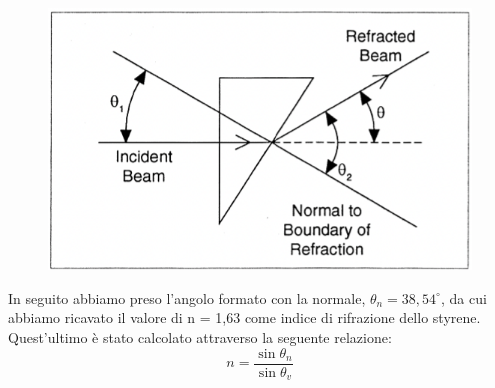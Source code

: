 \begin{figure}[h!]
    \centering
    \includegraphics[scale=.7]{Immagini/triangolo.png}
    \caption{}
    \label{triangolo}
\end{figure}
 
In seguito abbiamo preso l'angolo formato con la normale, $\theta_n = 38,54 ^\circ$, da cui abbiamo ricavato il valore di n = 1,63 come indice di rifrazione dello styrene. Quest'ultimo è stato calcolato attraverso la seguente relazione:
$$
n=\dfrac{\sin\theta_n}{\sin\theta_v}
$$
